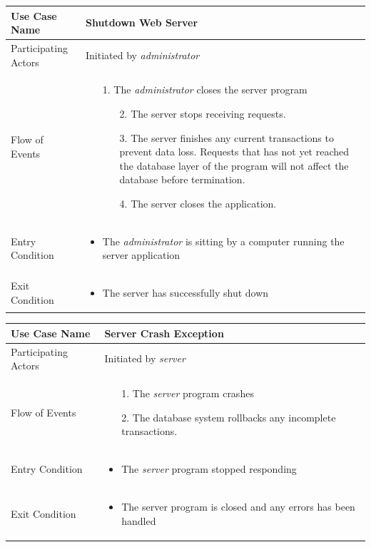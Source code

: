 \begin{center}
	\begin{tabular}{ | l | p{10cm} |  }
		 \hline
		Use Case Name & Shutdown Web Server \\ \hline
		Participating Actors & Initiated by \emph{administrator} \\ \hline
		Flow of Events & \begin{enumerate}
						\item[1.] The \emph{administrator} closes the server program
						\begin{enumerate}
							\item[2.] The server stops receiving requests.
							\item[3.] The server finishes any current transactions to prevent data loss. Requests that has not yet reached the database layer of the program will not affect the database before termination.
							\item[4.] The server closes the application.			 
						\end{enumerate}
					\end{enumerate} \\ \hline
		Entry Condition & \begin{itemize}
						\item The \emph{administrator} is sitting by a computer running the server application
					\end{itemize} \\ \hline
		Exit Condition & \begin{itemize}
						\item The server has successfully shut down
					\end{itemize} \\
		\hline
	\end{tabular}
\end{center}

\begin{center}
	\begin{tabular}{ | l | p{10cm} |  }
		 \hline
		Use Case Name & Server Crash Exception \\ \hline
		Participating Actors & Initiated by \emph{server} \\ \hline
		Flow of Events & \begin{enumerate}
						\item[1.] The \emph{server} program crashes
						\item[2.] The database system rollbacks any incomplete transactions.
						\end{enumerate} \\ \hline
		Entry Condition & \begin{itemize}
						\item The \emph{server} program stopped responding
					\end{itemize} \\ \hline
		Exit Condition & \begin{itemize}
						\item The server program is closed and any errors has been handled
					\end{itemize} \\
		\hline
	\end{tabular}
\end{center}

